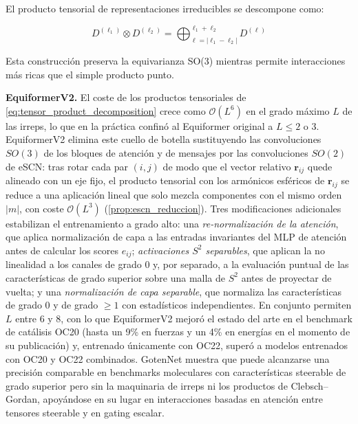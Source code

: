 El producto tensorial de representaciones irreducibles se descompone como:

\begin{equation}
    D^{(\ell_1)} \otimes D^{(\ell_2)} = \bigoplus_{\ell=|\ell_1-\ell_2|}^{\ell_1+\ell_2} D^{(\ell)}
    \label{eq:tensor_product_decomposition}
\end{equation}

Esta construcción preserva la equivarianza SO(3) mientras permite interacciones más ricas que el simple producto punto.

\textbf{EquiformerV2.} El coste de los productos tensoriales de \eqref{eq:tensor_product_decomposition} crece como $\mathcal{O}(L^6)$ en el grado máximo $L$ de las irreps, lo que en la práctica confinó al Equiformer original a $L \leq 2$ o $3$. EquiformerV2 \citep{liao2024equiformerv2} elimina este cuello de botella sustituyendo las convoluciones $SO(3)$ de los bloques de atención y de mensajes por las convoluciones $SO(2)$ de eSCN: tras rotar cada par $(i,j)$ de modo que el vector relativo $\mathbf{r}_{ij}$ quede alineado con un eje fijo, el producto tensorial con los armónicos esféricos de $\mathbf{r}_{ij}$ se reduce a una aplicación lineal que solo mezcla componentes con el mismo orden $|m|$, con coste $\mathcal{O}(L^3)$ (\autoref{prop:escn_reduccion}). Tres modificaciones adicionales estabilizan el entrenamiento a grado alto: una \emph{re-normalización de la atención}, que aplica normalización de capa a las entradas invariantes del \gls{MLP} de atención antes de calcular los scores $e_{ij}$; \emph{activaciones $S^2$ separables}, que aplican la no linealidad a los canales de grado 0 y, por separado, a la evaluación puntual de las características de grado superior sobre una malla de $S^2$ antes de proyectar de vuelta; y una \emph{normalización de capa separable}, que normaliza las características de grado 0 y de grado $\geq 1$ con estadísticos independientes. En conjunto permiten $L$ entre 6 y 8, con lo que EquiformerV2 mejoró el estado del arte en el benchmark de catálisis OC20 (hasta un 9\% en fuerzas y un 4\% en energías en el momento de su publicación) y, entrenado únicamente con OC22, superó a modelos entrenados con OC20 y OC22 combinados. GotenNet \citep{aykent2025gotennet} muestra que puede alcanzarse una precisión comparable en benchmarks moleculares con características steerable de grado superior pero sin la maquinaria de irreps ni los productos de Clebsch--Gordan, apoyándose en su lugar en interacciones basadas en atención entre tensores steerable y en gating escalar.

